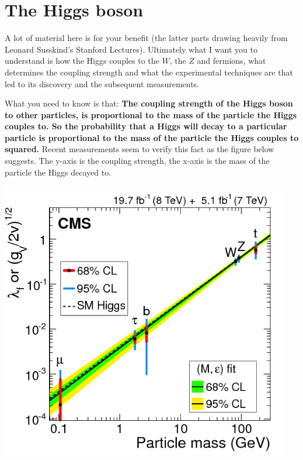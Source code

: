 \section{The Higgs boson}
A lot of material here is for your benefit (the latter parts drawing heavily from Leonard Susskind's Stanford Lectures). Ultimately what I want you to understand is how the Higgs couples to the $W$, the $Z$ and fermions, what determines the coupling strength and what the experimental techniques are that led to its discovery and the subsequent measurements.

What you need to know is that:
{\bf The coupling strength of the Higgs boson to other particles, is proportional to the mass of the particle the Higgs couples to. So the probability that a Higgs will decay to a particular particle is proportional to the mass of the particle the Higgs couples to squared.}
Recent measurements seem to verify this fact as the figure below suggests. The y-axis is the coupling strength, the x-axis is the mass of the particle the Higgs decayed to.
\begin{center}
\includegraphics[width=0.95\textwidth]{fig/higgs/cms_higgs_couplings.png}
\end{center}


